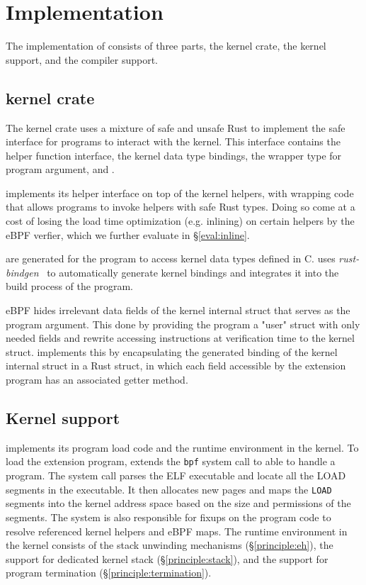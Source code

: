 \section{Implementation}
\label{sec:impl}
The implementation of \projname{} consists of three parts, the \projname{}
    kernel crate, the kernel support, and the compiler support.

\subsection{\projname{} kernel crate}
\label{impl:kernel-crate}
The kernel crate uses a mixture of safe and unsafe Rust to implement the safe
    interface for \projname{} programs to interact with the kernel.
This interface contains the helper function interface, the kernel data type
    bindings, the wrapper type for program argument, and .

\projname{} implements its helper interface on top of the kernel helpers, with
    wrapping code that allows programs to invoke helpers with safe Rust types.
Doing so come at a cost of losing the load time optimization (e.g. inlining) on
    certain helpers by the eBPF verfier, which we further evaluate in
    \S\ref{eval:inline}.

 are generated for the program to access kernel
    data types defined in C.
\projname{} uses \emph{rust-bindgen}~\cite{bindgen} to automatically generate
    kernel bindings and integrates it into the build process of the program.

eBPF hides irrelevant data fields of the kernel internal struct that serves as
    the program argument.
This done by providing the program a "user" struct with only needed fields and
    rewrite accessing instructions at verification time to the kernel struct.
\projname{} implements this by encapsulating the generated binding of the
    kernel internal struct in a Rust struct, in which each field accessible by
    the extension program has an associated getter method.

\subsection{Kernel support}
\label{impl:kernel}
\projname{} implements its program load code and the runtime environment in the
    kernel.
To load the extension program, \projname{} extends the \texttt{bpf} system
    call to able to handle a \projname{} program.
The system call parses the ELF executable and locate all the LOAD segments in
    the executable.
It then allocates new pages and maps the \texttt{LOAD} segments into the kernel
    address space based on the size and permissions of the segments.
The system is also responsible for fixups on the program code to resolve
    referenced kernel helpers and eBPF maps.
The \projname{} runtime environment in the kernel consists of the stack
    unwinding mechanisms (\S\ref{principle:eh}), the support for dedicated
    kernel stack (\S\ref{principle:stack}), and the support for program
    termination (\S\ref{principle:termination}).

